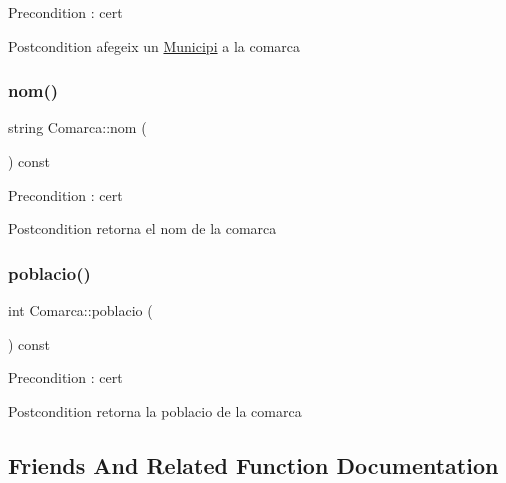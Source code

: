 \begin{DoxyPrecond}{Precondition}
\+: cert 
\end{DoxyPrecond}
\begin{DoxyPostcond}{Postcondition}
afegeix un \hyperlink{classMunicipi}{Municipi} a la comarca 
\end{DoxyPostcond}
\mbox{\label{classComarca_aacbbe9a77b5a81d8fd86c06e815e5edc}} 
\subsubsection{\texorpdfstring{nom()}{nom()}}
{\footnotesize\ttfamily string Comarca\+::nom (\begin{DoxyParamCaption}{ }\end{DoxyParamCaption}) const}

\begin{DoxyPrecond}{Precondition}
\+: cert 
\end{DoxyPrecond}
\begin{DoxyPostcond}{Postcondition}
retorna el nom de la comarca 
\end{DoxyPostcond}
\mbox{\label{classComarca_affecc6c07ec0600d6e3e62b23e564222}} 
\subsubsection{\texorpdfstring{poblacio()}{poblacio()}}
{\footnotesize\ttfamily int Comarca\+::poblacio (\begin{DoxyParamCaption}{ }\end{DoxyParamCaption}) const}

\begin{DoxyPrecond}{Precondition}
\+: cert 
\end{DoxyPrecond}
\begin{DoxyPostcond}{Postcondition}
retorna la poblacio de la comarca 
\end{DoxyPostcond}


\subsection{Friends And Related Function Documentation}
\mbox{\label{classComarca_a23f6b084aaeb22a3c2cfdbb11a6b6853}} 
